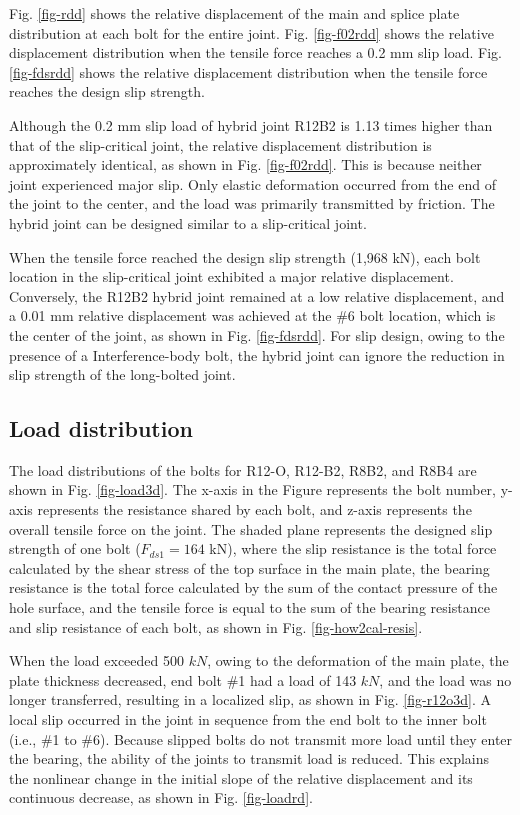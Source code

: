 Fig. \ref{fig-rdd} shows the relative displacement of the main and splice plate distribution at each bolt for the entire joint. Fig. \ref{fig-f02rdd} shows the relative displacement distribution when the tensile force reaches a 0.2 mm slip load. Fig. \ref{fig-fdsrdd} shows the relative displacement distribution when the tensile force reaches the design slip strength.

Although the 0.2 mm slip load of hybrid joint R12B2 is 1.13 times higher than that of the slip-critical joint, the relative displacement distribution is approximately identical, as shown in Fig. \ref{fig-f02rdd}. This is because neither joint experienced major slip. Only elastic deformation occurred from the end of the joint to the center, and the load was primarily transmitted by friction. The hybrid joint can be designed similar to a slip-critical joint.

When the tensile force reached the design slip strength (1,968 kN), each bolt location in the slip-critical joint exhibited a major relative displacement. Conversely, the R12B2 hybrid joint remained at a low relative displacement, and a 0.01 mm relative displacement was achieved  at the \#6 bolt location, which is the center of the joint, as shown in Fig. \ref{fig-fdsrdd}. For slip design, owing to the presence of a Interference-body bolt, the hybrid joint can ignore the reduction in slip strength of the long-bolted joint.

\subsection{Load distribution}

The load distributions of the bolts for R12-O, R12-B2, R8B2, and R8B4 are shown in Fig. \ref{fig-load3d}. The x-axis in the Figure represents the bolt number, y-axis represents the resistance shared by each bolt, and z-axis represents the overall tensile force on the joint. The shaded plane represents the designed slip strength of one bolt ($F_{ds1}=164 $ kN), where the slip resistance is the total force calculated by the shear stress of the top surface in the main plate, the bearing resistance is the total force calculated by the sum of the contact pressure of the hole surface, and the tensile force is equal to the sum of the bearing resistance and slip resistance of each bolt, as shown in Fig. \ref{fig-how2cal-resis}. 

When the load exceeded 500 $kN$, owing to the deformation of the main plate, the plate thickness decreased, end bolt \#1 had a load of 143 $kN$, and the load was no longer transferred, resulting in a localized slip, as shown in Fig. \ref{fig-r12o3d}. A local slip occurred in the joint in sequence from the end bolt to the inner bolt (i.e., \#1 to \#6). Because slipped bolts do not transmit more load until they enter the bearing, the ability of the joints to transmit load is reduced. This explains the nonlinear change in the initial slope of the relative displacement and its continuous decrease, as shown in Fig. \ref{fig-loadrd}.

